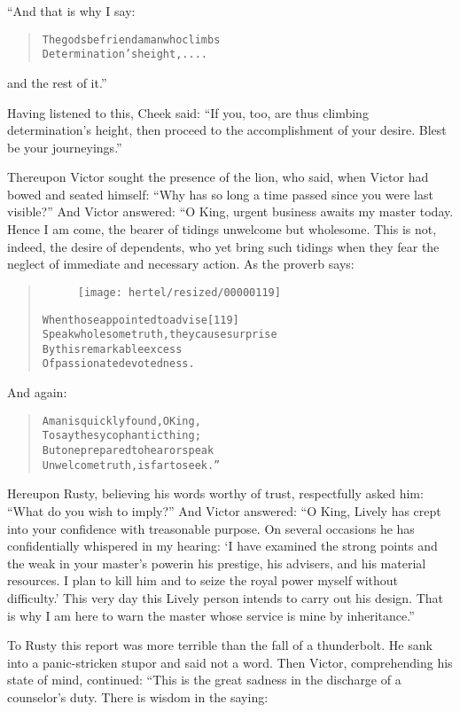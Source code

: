 \documentclass[article, twoside, 10pt]{memoir}
\renewenvironment{verbatim}{%
\begin{quote}%
\vskip -10pt%
\begin{alltt}\normalfont\small}{\end{alltt}%
\end{quote}%
\vskip -10pt
} %
\begin{document}
“And that is why I say:

\begin{verbatim}
The gods befriend a man who climbs
    Determination's height, ....
\end{verbatim}
and the rest of it.”

Having listened to this, Cheek said:
``If you, too, are thus climbing determination's height, then proceed to the accomplishment of your desire. Blest be your journeyings.''

Thereupon Victor sought the presence of the lion, who said, when
Victor had bowed and seated himself:
``Why has so long a time passed since you were last visible?'' And
Victor answered: “O King, urgent business awaits my master today.
Hence I am come, the bearer of tidings unwelcome but wholesome.
This is not, indeed, the desire of dependents, who yet bring such
tidings when they fear the neglect of immediate and necessary
action. As the proverb says:

\begin{verbatim}
\begin{figure}[p]\texttt{[image: hertel/resized/00000119]}\end{figure}When those appointed to advise                          [119]
Speak wholesome truth, they cause surprise
By this remarkable excess
Of passionate devotedness.
\end{verbatim}
And again:

\begin{verbatim}
A man is quickly found, O King,
To say the sycophantic thing;
But one prepared to hear or speak
Unwelcome truth, is far to seek.”
\end{verbatim}
Hereupon Rusty, believing his words worthy of trust, respectfully
asked him: ``What do you wish to imply?'' And Victor answered:
``O King, Lively has crept into your confidence with treasonable purpose. On several occasions he has confidentially whispered in my hearing: `I have examined the strong points and the weak in your master's power{\textemdash}in his prestige, his advisers, and his material resources. I plan to kill him and to seize the royal power myself without difficulty.' This very day this Lively person intends to carry out his design. That is why I am here to warn the master whose service is mine by inheritance.''

To Rusty this report was more terrible than the fall of a
thunderbolt. He sank into a panic-stricken stupor and said not a
word. Then Victor, comprehending his state of mind, continued:
“This is the great sadness in the discharge of a counselor's duty.
There is wisdom in the saying:
\end{document}

